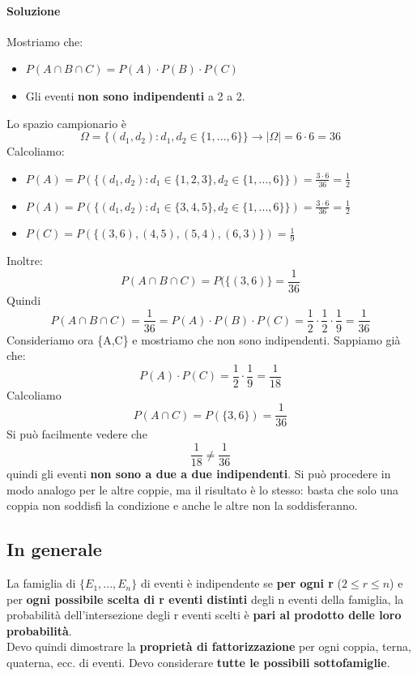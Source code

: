 \documentclass{report}
\begin{document}
\begin{enumerate}
    \paragraph{Soluzione} Mostriamo che: \begin{itemize}
        \item \(P(A\cap B \cap C) = P(A)\cdot P(B)\cdot P(C)\)
        \item Gli eventi \textbf{non sono indipendenti} a 2 a 2.
    \end{itemize}
    Lo spazio campionario è \[\Omega = \{(d_1, d_2): d_1,d_2 \in \{1,...,6\}\} \xrightarrow{} |\Omega| = 6\cdot 6 = 36\]
    Calcoliamo: \begin{itemize}
        \item \(P(A) = P(\{(d_1,d_2): d_1 \in \{1,2,3\}, d_2 \in \{1,...,6\}\}) = \frac{3\cdot 6}{36} = \frac{1}{2}\)
        \item \(P(A) = P(\{(d_1,d_2): d_1 \in \{3,4,5\}, d_2 \in \{1,...,6\}\}) = \frac{3\cdot 6}{36} = \frac{1}{2}\)
        \item \(P(C) = P(\{(3,6), (4,5), (5,4), (6,3)\}) = \frac{1}{9}\)
    \end{itemize}
    Inoltre: \[P(A\cap B\cap C) = P(\{(3,6)\} = \frac{1}{36}\]
    Quindi \[P(A\cap B\cap C) = \frac{1}{36} = P(A)\cdot P(B)\cdot P(C) = \frac{1}{2}\cdot \frac{1}{2}\cdot \frac{1}{9} = \frac{1}{36}\] 
    Consideriamo ora \{A,C\} e mostriamo che non sono indipendenti. Sappiamo già che: \[P(A)\cdot P(C) = \frac{1}{2}\cdot \frac{1}{9} = \frac{1}{18}\]
    Calcoliamo \[P(A\cap C) = P(\{3,6\}) = \frac{1}{36}\]
    Si può facilmente vedere che \[\frac{1}{18} \neq \frac{1}{36}\]
    quindi gli eventi \textbf{non sono a due a due indipendenti}. Si può procedere in modo analogo per le altre coppie, ma il risultato è lo stesso: basta che solo una coppia non soddisfi la condizione e anche le altre non la soddisferanno.
\end{enumerate}
\subsection{In generale}
La famiglia di \(\{E_1,...,E_n\}\) di eventi è indipendente se \textbf{per ogni r} (\(2 \leq r \leq n\)) e per \textbf{ogni possibile scelta di r eventi distinti} degli n eventi della famiglia, la probabilità dell'intersezione degli r eventi scelti è \textbf{pari al prodotto delle loro probabilità}.\\
Devo quindi dimostrare la \textbf{proprietà di fattorizzazione} per ogni coppia, terna, quaterna, ecc. di eventi. Devo considerare \textbf{tutte le possibili sottofamiglie}.
\end{document}
